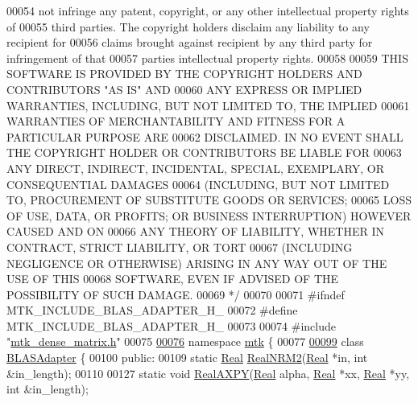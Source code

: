 \begin{DoxyCode}
00054 \textcolor{comment}{not infringe any patent, copyright, or any other intellectual property rights of}
00055 \textcolor{comment}{third parties. The copyright holders disclaim any liability to any recipient for}
00056 \textcolor{comment}{claims brought against recipient by any third party for infringement of that}
00057 \textcolor{comment}{parties intellectual property rights.}
00058 \textcolor{comment}{}
00059 \textcolor{comment}{THIS SOFTWARE IS PROVIDED BY THE COPYRIGHT HOLDERS AND CONTRIBUTORS "AS IS" AND}
00060 \textcolor{comment}{ANY EXPRESS OR IMPLIED WARRANTIES, INCLUDING, BUT NOT LIMITED TO, THE IMPLIED}
00061 \textcolor{comment}{WARRANTIES OF MERCHANTABILITY AND FITNESS FOR A PARTICULAR PURPOSE ARE}
00062 \textcolor{comment}{DISCLAIMED. IN NO EVENT SHALL THE COPYRIGHT HOLDER OR CONTRIBUTORS BE LIABLE FOR}
00063 \textcolor{comment}{ANY DIRECT, INDIRECT, INCIDENTAL, SPECIAL, EXEMPLARY, OR CONSEQUENTIAL DAMAGES}
00064 \textcolor{comment}{(INCLUDING, BUT NOT LIMITED TO, PROCUREMENT OF SUBSTITUTE GOODS OR SERVICES;}
00065 \textcolor{comment}{LOSS OF USE, DATA, OR PROFITS; OR BUSINESS INTERRUPTION) HOWEVER CAUSED AND ON}
00066 \textcolor{comment}{ANY THEORY OF LIABILITY, WHETHER IN CONTRACT, STRICT LIABILITY, OR TORT}
00067 \textcolor{comment}{(INCLUDING NEGLIGENCE OR OTHERWISE) ARISING IN ANY WAY OUT OF THE USE OF THIS}
00068 \textcolor{comment}{SOFTWARE, EVEN IF ADVISED OF THE POSSIBILITY OF SUCH DAMAGE.}
00069 \textcolor{comment}{*/}
00070 
00071 \textcolor{preprocessor}{#ifndef MTK\_INCLUDE\_BLAS\_ADAPTER\_H\_}
00072 \textcolor{preprocessor}{#define MTK\_INCLUDE\_BLAS\_ADAPTER\_H\_}
00073 
00074 \textcolor{preprocessor}{#include "\hyperlink{mtk__dense__matrix_8h}{mtk\_dense\_matrix.h}"}
00075 
\hypertarget{mtk__blas__adapter_8h_source_l00076}{}\hyperlink{namespacemtk}{00076} \textcolor{keyword}{namespace }\hyperlink{namespacemtk}{mtk} \{
00077 
\hypertarget{mtk__blas__adapter_8h_source_l00099}{}\hyperlink{classmtk_1_1BLASAdapter}{00099} \textcolor{keyword}{class }\hyperlink{classmtk_1_1BLASAdapter}{BLASAdapter} \{
00100  \textcolor{keyword}{public}:
00109   \textcolor{keyword}{static} \hyperlink{group__c01-roots_gac080bbbf5cbb5502c9f00405f894857d}{Real} \hyperlink{classmtk_1_1BLASAdapter_ab92440888b730863244c5d9479c11aca}{RealNRM2}(\hyperlink{group__c01-roots_gac080bbbf5cbb5502c9f00405f894857d}{Real} *in, \textcolor{keywordtype}{int} &in\_length);
00110 
00127   \textcolor{keyword}{static} \textcolor{keywordtype}{void} \hyperlink{classmtk_1_1BLASAdapter_a081cd092ae65e730f44eae8643edd539}{RealAXPY}(\hyperlink{group__c01-roots_gac080bbbf5cbb5502c9f00405f894857d}{Real} alpha, \hyperlink{group__c01-roots_gac080bbbf5cbb5502c9f00405f894857d}{Real} *xx, \hyperlink{group__c01-roots_gac080bbbf5cbb5502c9f00405f894857d}{Real} *yy, \textcolor{keywordtype}{int} &in\_length);

\end{DoxyCode}
